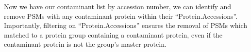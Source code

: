 \documentclass[9pt,a4paper,]{extarticle}
\newenvironment{Shaded}{\begin{snugshade}}{\end{snugshade}}
\newcommand{\AttributeTok}[1]{\textcolor[rgb]{0.13,0.29,0.53}{#1}}
\newcommand{\ConstantTok}[1]{\textcolor[rgb]{0.56,0.35,0.01}{#1}}
\newcommand{\DocumentationTok}[1]{\textcolor[rgb]{0.56,0.35,0.01}{\textbf{\textit{#1}}}}
\newcommand{\FunctionTok}[1]{\textcolor[rgb]{0.13,0.29,0.53}{\textbf{#1}}}
\newcommand{\NormalTok}[1]{#1}
\newcommand{\OtherTok}[1]{\textcolor[rgb]{0.56,0.35,0.01}{#1}}
\newcommand{\SpecialCharTok}[1]{\textcolor[rgb]{0.81,0.36,0.00}{\textbf{#1}}}
\newcommand{\StringTok}[1]{\textcolor[rgb]{0.31,0.60,0.02}{#1}}
\begin{document}
\begin{Shaded}
\end{Shaded}

Now we have our contaminant list by accession number, we can identify and remove
PSMs with any contaminant protein within their ``Protein.Accessions''.
Importantly, filtering on ``Protein.Accessions'' ensures the removal of PSMs which
matched to a protein group containing a contaminant protein, even if the
contaminant protein is not the group's master protein.
\end{document}
